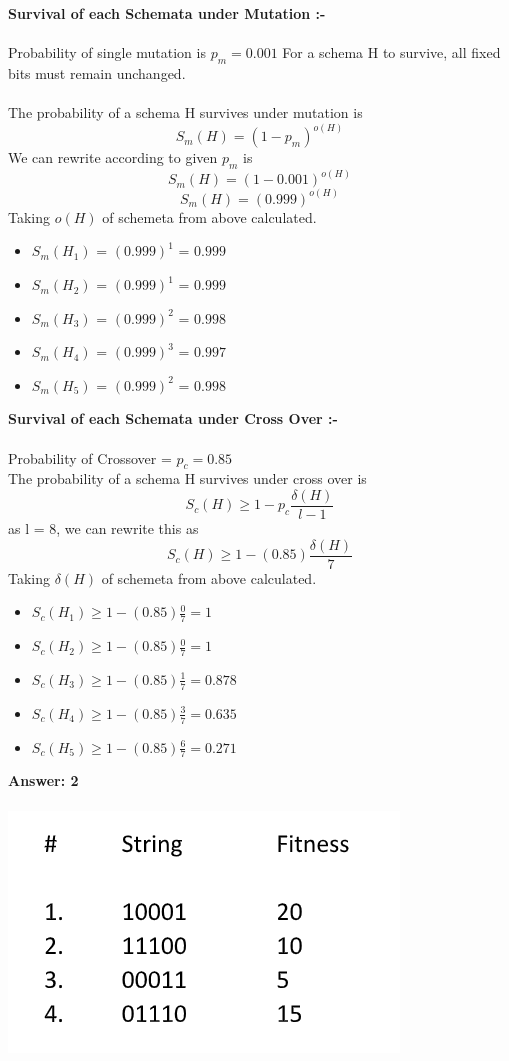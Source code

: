 \documentclass[12pt,letterpaper]{article}
\newcommand \order{o}
\begin{document}
\textbf{\large Survival of each Schemata under Mutation :-}\\\\
Probability of single mutation is $p_m = 0.001$
For a schema H to survive, all fixed bits must remain unchanged.\\
\\The probability of a schema H survives under mutation is
\begin{equation}
    S_m(H) = (1 - p_m) ^ {\order(H)}
\end{equation}
We can rewrite according to given $p_m$ is 
$$S_m(H) = (1 - 0.001)^ {\order(H)}$$
$$S_m(H) = (0.999)^ {\order(H)}$$
Taking $\order(H)$ of schemeta from above calculated.
\begin{itemize}
    \item $S_m(H_1)$ = $(0.999)^ {1}$ = $0.999$
    \item $S_m(H_2)$ = $(0.999)^ {1}$ = $0.999$
    \item $S_m(H_3)$ = $(0.999)^ {2}$ = $0.998$
    \item $S_m(H_4)$ = $(0.999)^ {3}$ = $0.997$
    \item $S_m(H_5)$ = $(0.999)^ {2}$ = $0.998$
\end{itemize}

\textbf{\large Survival of each Schemata under Cross Over :-}\\\\
Probability of Crossover = $p_c = 0.85$
\\The probability of a schema H survives under cross over is
\begin{equation}
    S_c(H) \geqslant 1 - p_c \frac{\delta(H)}{l - 1}
\end{equation}
as l = 8, we can rewrite this as
$$S_c(H) \geqslant 1 - (0.85) \frac{\delta(H)}{7}$$
Taking $\delta(H)$ of schemeta from above calculated.
\begin{itemize}
    \item $S_c(H_1) \geqslant 1 - (0.85) \frac{0}{7} = 1$
    \item $S_c(H_2) \geqslant 1 - (0.85) \frac{0}{7} = 1$
    \item $S_c(H_3) \geqslant 1 - (0.85) \frac{1}{7} = 0.878$
    \item $S_c(H_4) \geqslant 1 - (0.85) \frac{3}{7} = 0.635$
    \item $S_c(H_5) \geqslant 1 - (0.85) \frac{6}{7} = 0.271$
\end{itemize}

\newpage
\textbf{\Large Answer: 2}\\\\
\includegraphics[]{a}
\end{document}
